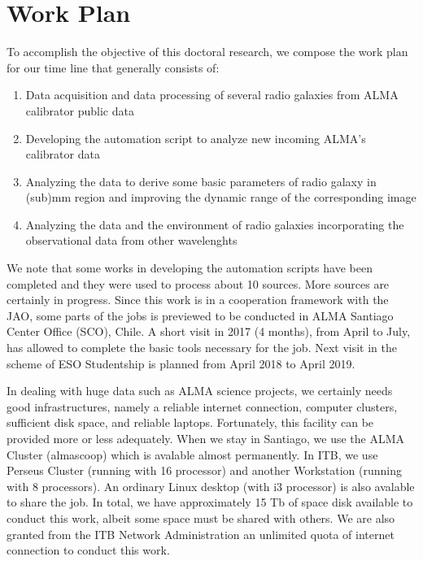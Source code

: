 \chapter{Work Plan}

To accomplish the objective of this doctoral research, we compose the work plan for our time line that generally consists of:

\begin{enumerate}

\item Data acquisition and data processing of several radio galaxies from ALMA calibrator public data

\item Developing the automation script to analyze new incoming ALMA's calibrator data 

\item Analyzing the data to derive some basic parameters of radio galaxy in (sub)mm region and improving the dynamic range of 
the corresponding image

\item Analyzing the data and the environment of radio galaxies incorporating the observational data from other wavelenghts

\end{enumerate} 

We note that some works in developing the automation scripts have been completed and they were used to process about 10 sources. More sources are certainly in progress. Since this work is in a cooperation framework with the JAO, some parts of the jobs is previewed to be conducted in ALMA Santiago Center Office (SCO), Chile. A short visit in 2017 (4 months), from April to July, has allowed to complete the basic tools necessary for the job. Next visit in the scheme of ESO Studentship is planned from April 2018 to April 2019. 

In dealing with huge data such as ALMA science projects, we certainly needs good infrastructures, namely a reliable internet connection, computer clusters, sufficient disk space, and reliable laptops. Fortunately, this facility can be provided more or less adequately. When we stay in Santiago, we use the ALMA Cluster (almascoop) which is avalable almost permanently. In ITB, we use Perseus Cluster (running with 16 processor) and another Workstation (running with 8 processors). An ordinary Linux desktop (with i3 processor) is also avalable to share the job. In total, we have approximately 15 Tb of space disk available to conduct this work, albeit some space must be shared with others. We are also granted from the ITB Network Administration an unlimited quota of internet connection to conduct this work.  

